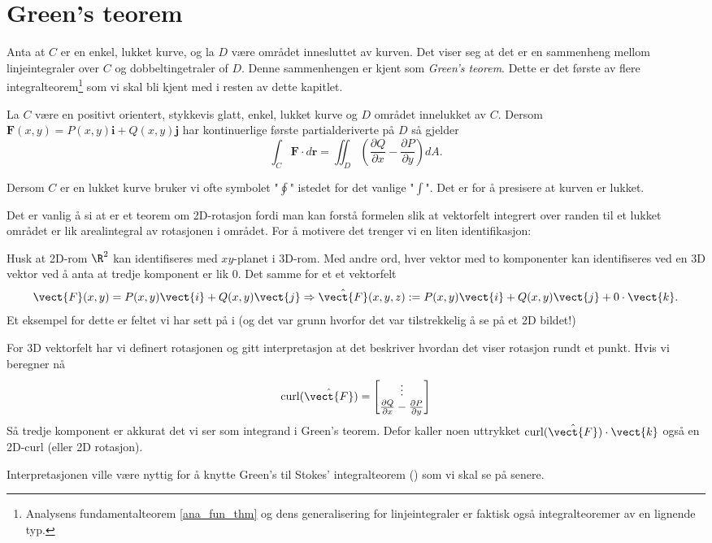 %
%
%
\section{Green's teorem}\label{sect:green}
Anta at \( C \) er en enkel, lukket kurve, og la \( D \) være området innesluttet av kurven. Det viser seg at det er en sammenheng mellom linjeintegraler over $C$ og dobbeltingetraler of $D$. 
Denne sammenhengen er kjent som \textit{Green's teorem}. Dette er det første av flere integralteorem\footnote{Analysens fundamentalteorem \eqref{ana_fun_thm} og dens generalisering for linjeintegraler  er faktisk også integralteoremer av en lignende typ.} som vi skal bli kjent med i resten av dette kapitlet. 


\begin{thm}\label{thm:Green}
La \( C \) være en positivt orientert, stykkevis glatt, enkel, lukket kurve og \( D \) området innelukket av \( C \). Dersom \( \mathbf{F}(x,y) = P(x,y)\mathbf{i} + Q(x,y) \mathbf{j} \) har kontinuerlige første partialderiverte på \( D \) så gjelder 
\[
\int_C \mathbf{F} \cdot d\mathbf{r} = \iint_D \left( \frac{\partial Q}{\partial x} - \frac{\partial P}{\partial y} \right) dA.
\]
\end{thm}

\begin{rem}{}
Dersom $C$ er en lukket kurve bruker vi ofte symbolet "$\oint$" istedet for det vanlige "$\int$". Det er for å presisere at kurven er lukket.

Det er vanlig å si at  er et teorem om 2D-rotasjon fordi man kan forstå formelen slik at vektorfelt integrert over randen til et lukket området er lik arealintegral av rotasjonen i området. For å motivere det trenger vi en liten identifikasjon:

Husk at 2D-rom $\R^2$ kan identifiseres med $xy$-planet i 3D-rom. Med andre ord, hver vektor med to komponenter kan identifiseres ved en 3D vektor ved å anta at tredje komponent er lik $0$. Det samme for et et vektorfelt
\[\vect{F} (x,y)=P(x,y)\vect{i}+Q(x,y)\vect{j} \Rightarrow \hat{\vect{F}}(x,y,z):=P(x,y)\vect{i}+Q(x,y)\vect{j}+0\cdot \vect{k}.\]
Et eksempel for dette er feltet vi har sett på i  (og det var grunn hvorfor det var tilstrekkelig å se på et 2D bildet!)

For 3D vektorfelt har vi definert rotasjonen og gitt interpretasjon at det beskriver hvordan det viser rotasjon rundt et punkt.
Hvis vi beregner nå
\[\mathrm{curl} (\hat{\vect{F}}) = \begin{bmatrix} \vdots \\ \frac{\partial Q}{\partial x}-\frac{\partial P}{\partial y}\end{bmatrix}\]
Så tredje komponent er akkurat det vi ser som integrand i Green's teorem. Defor kaller noen uttrykket $\mathrm{curl}(\hat{\vect{F}})\cdot \vect{k}$ også en 2D-curl (eller 2D rotasjon).

Interpretasjonen ville være nyttig for å knytte Green's  til Stokes'  integralteorem () som vi skal se på senere.
\end{rem}

